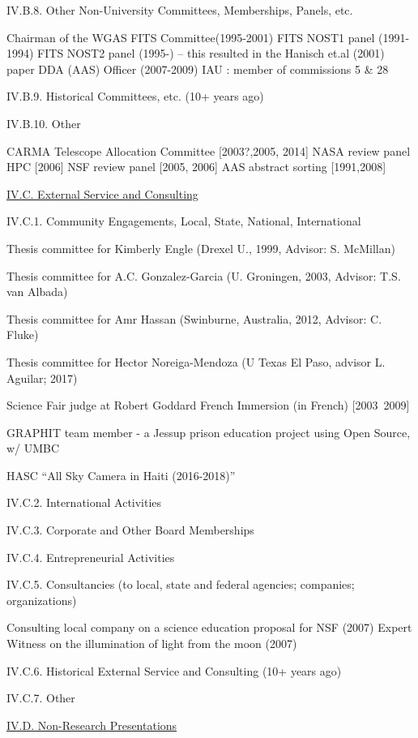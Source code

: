 \documentclass[11pt,letterpaper]{article}
\newcommand{\newi}{\newline\indent}
\begin{document}
IV.B.8. Other Non-University Committees, Memberships, Panels, etc.

Chairman of the WGAS FITS Committee(1995-2001)\newi
FITS NOST1 panel (1991-1994) \newi
FITS NOST2 panel (1995-) -- this resulted in the Hanisch et.al (2001) paper\newi
DDA (AAS) Officer (2007-2009)\newi
IAU : member of commissions 5 \& 28\newi

IV.B.9. Historical Committees, etc. (10+ years ago)

IV.B.10. Other

CARMA Telescope Allocation Committee [2003?,2005, 2014]\newi
NASA review panel HPC [2006]\newi
NSF review panel  [2005, 2006]\newi
AAS abstract sorting [1991,2008]\newi


\underline{IV.C. External Service and Consulting}

IV.C.1. Community Engagements, Local, State, National, International

Thesis committee for Kimberly Engle (Drexel U., 1999, Advisor: S. McMillan)

Thesis committee for  A.C. Gonzalez-Garcia (U. Groningen, 2003, Advisor: T.S. van Albada) 

Thesis committee for Amr Hassan (Swinburne, Australia, 2012, Advisor: C. Fluke)

Thesis committee for Hector Noreiga-Mendoza (U Texas El Paso, advisor L. Aguilar; 2017)

Science Fair judge at Robert Goddard French Immersion (in French) [2003~2009]

GRAPHIT team member - a Jessup prison  education project using Open Source, w/ UMBC

HASC ``All Sky Camera in Haiti (2016-2018)''


IV.C.2. International Activities 

IV.C.3. Corporate and Other Board Memberships

IV.C.4. Entrepreneurial Activities

IV.C.5. Consultancies (to local, state and federal agencies; companies; organizations)

Consulting local company on a science education proposal for NSF (2007)\newi
Expert Witness on the illumination of light from the moon (2007)\newi
                
IV.C.6. Historical External Service and Consulting (10+ years ago)

IV.C.7. Other


\underline{IV.D. Non-Research Presentations}
\end{document}
